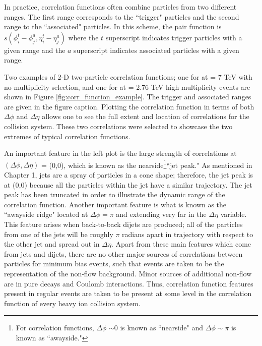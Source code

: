In practice, correlation functions often combine particles from two different \pt ranges. The first \pt range corresponds to the ``trigger" particles and the second range to the ``associated" particles. In this scheme, the pair function is $s(\phi_i^t - \phi_j^a,\eta_i^t - \eta_j^a)$ where the $t$ superscript indicates trigger particles with a given \pt range and the $a$ superscript indicates associated particles with a given \pt range. 

Two examples of 2-D two-particle correlation functions; one for \pp at \sqs = 7 TeV with no multiplicity selection, and one for \pbpb at \sqsn = 2.76 TeV high multiplicity events are shown in Figure \ref{fig:corr_function_example}. The trigger and associated \pt ranges are given in the figure caption. Plotting the correlation function in terms of both $\Delta\phi$ and $\Delta\eta$ allows one to see the full extent and location of correlations for the collision system. These two correlations were selected to showcase the two extremes of typical correlation functions. 

An important feature in the left plot is the large strength of correlations at $(\Delta\phi,\Delta\eta)$ = (0,0), which is known as the nearside\footnote{For correlation functions, $\Delta\phi $ $\sim$0 is known as ``nearside" and $\Delta\phi  \sim\pi$ is known as ``awayside."}``jet peak." As mentioned in Chapter 1, jets are a spray of particles in a cone shape; therefore, the jet peak is at (0,0) because all the particles within the jet have a similar trajectory. The jet peak has been truncated in order to illustrate the dynamic range of the correlation function. Another important feature is what is known as the ``awayside ridge" located at  $\Delta\phi = \pi$ and extending very far in the $\Delta\eta$ variable. This feature arises when back-to-back dijets are produced; all of the particles from one of the jets will be roughly $\pi$ radians apart in trajectory with respect to the other jet and spread out in $\Delta\eta$. Apart from these main features which come from jets and dijets, there are no other major sources of correlations between particles for minimum bias \pp events, such that \pp events are taken to be the representation of the non-flow background. Minor sources of additional non-flow are in pure decays and Coulomb interactions. Thus, correlation function features present in regular \pp events are taken to be present at some level in the correlation function of every heavy ion collision system.

